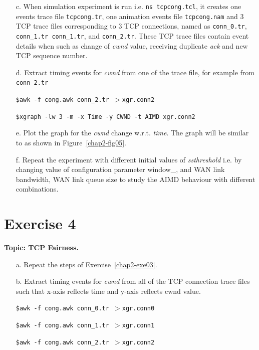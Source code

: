 \begin{multicols}{2}
\begin{itemize}
\item[c.] When simulation experiment is run i.e. \texttt{ns tcpcong.tcl}, it creates one events trace file \texttt{tcpcong.tr}, one animation events file \texttt{tcpcong.nam} and 3 TCP trace files corresponding to 3 TCP connections, named as \texttt{conn\_0.tr}, \texttt{conn\_1.tr conn\_1.tr}, and \texttt{conn\_2.tr}. These TCP trace files contain event details when such as change of \textit{cwnd} value, receiving duplicate \textit{ack} and new TCP sequence number.

\item[d.] Extract timing events for \textit{cwnd} from one of the trace file, for example from \texttt{conn\_2.tr}

\texttt{\$awk -f cong.awk conn\_2.tr $> $xgr.conn2}

\texttt{\$xgraph -lw 3 -m -x Time -y CWND -t AIMD xgr.conn2}

\item[e.] Plot the graph for the \textit{cwnd} change w.r.t. \textit{time}. The graph will be similar to as shown in Figure~\ref{chap2-fig05}.

\item[f.] Repeat the experiment with different initial values of \textit{ssthreshold} i.e. by changing value of configuration parameter window\_, and WAN link bandwidth, WAN link queue size to study the AIMD behaviour with different combinations.
\end{itemize}

\section*{Exercise 4}\label{chap2-exe04}

\textbf{Topic: TCP Fairness.}

\begin{itemize}

\item[a.] Repeat the steps of Exercise~\ref{chap2-exe03}.

\item[b.] Extract timing events for \textit{cwnd} from all of the TCP connection trace files such that x-axis reflects time and y-axis reflects cwnd value.

\texttt{\$awk -f cong.awk conn\_0.tr $> $xgr.conn0}

\texttt{\$awk -f cong.awk conn\_1.tr $> $xgr.conn1}

\texttt{\$awk -f cong.awk conn\_2.tr $> $xgr.conn2}


\end{itemize}
\end{multicols}
